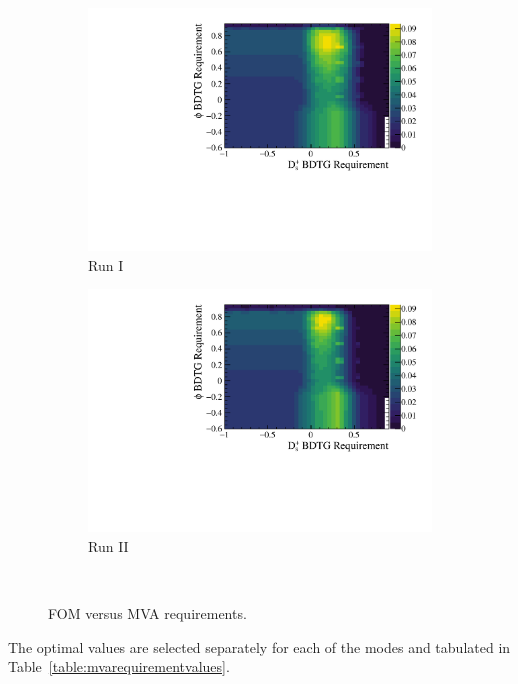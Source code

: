 \begin{figure}[!h]
\begin{subfigure}[t]{0.4\textwidth}
      \includegraphics[width=1.0\textwidth]{figs/Selection/Ds2KPiPi_BDTG_punzi_Run1_cont.pdf}
      \caption{Run I \decay{\Dsp}{\Kp\pim\pip}}
   \end{subfigure}
   \begin{subfigure}[t]{0.4\textwidth}
      \centering
      \includegraphics[width=1.0\textwidth]{figs/Selection/Ds2KPiPi_BDTG_punzi_Run2_cont.pdf}
      \caption{Run II \decay{\Dsp}{\Kp\pim\pip}}
   \end{subfigure}\\
   \caption{FOM versus MVA requirements.}
   \label{fig:mvaoptmisation}   
\end{figure}

The optimal values are selected separately for each of the modes and tabulated in Table~\ref{table:mvarequirementvalues}.

